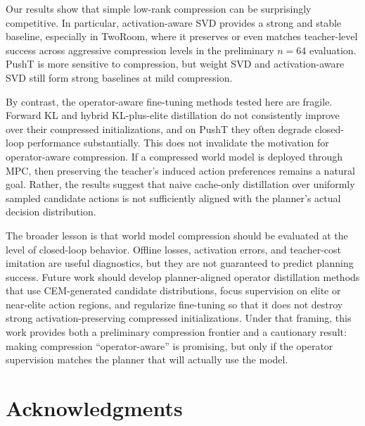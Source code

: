 \documentclass[11pt]{article}
\begin{document}
Our results show that simple low-rank compression can be surprisingly competitive. In particular, activation-aware SVD provides a strong and stable baseline, especially in TwoRoom, where it preserves or even matches teacher-level success across aggressive compression levels in the preliminary \(n=64\) evaluation. PushT is more sensitive to compression, but weight SVD and activation-aware SVD still form strong baselines at mild compression.

By contrast, the operator-aware fine-tuning methods tested here are fragile. Forward KL and hybrid KL-plus-elite distillation do not consistently improve over their compressed initializations, and on PushT they often degrade closed-loop performance substantially. This does not invalidate the motivation for operator-aware compression. If a compressed world model is deployed through MPC, then preserving the teacher's induced action preferences remains a natural goal. Rather, the results suggest that naive cache-only distillation over uniformly sampled candidate actions is not sufficiently aligned with the planner's actual decision distribution.

The broader lesson is that world model compression should be evaluated at the level of closed-loop behavior. Offline losses, activation errors, and teacher-cost imitation are useful diagnostics, but they are not guaranteed to predict planning success. Future work should develop planner-aligned operator distillation methods that use CEM-generated candidate distributions, focus supervision on elite or near-elite action regions, and regularize fine-tuning so that it does not destroy strong activation-preserving compressed initializations. Under that framing, this work provides both a preliminary compression frontier and a cautionary result: making compression ``operator-aware'' is promising, but only if the operator supervision matches the planner that will actually use the model.

\section*{Acknowledgments}




\end{document}

